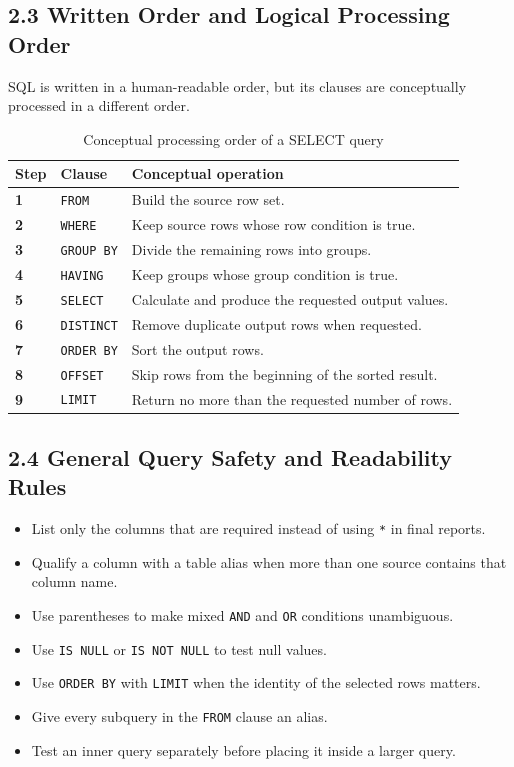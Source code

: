 \documentclass[12pt,a4paper]{article}
\begin{document}
\subsection*{2.3 Written Order and Logical Processing Order}
SQL is written in a human-readable order, but its clauses are conceptually processed in a
different order.

\begin{table}[H]
\centering
\renewcommand{\arraystretch}{1.35}
\begin{tabular}{>{\bfseries}p{1.5cm} p{3.2cm} p{7.7cm}}
\toprule
Step & Clause & Conceptual operation \\
\midrule
1 & \texttt{FROM} & Build the source row set. \\
2 & \texttt{WHERE} & Keep source rows whose row condition is true. \\
3 & \texttt{GROUP BY} & Divide the remaining rows into groups. \\
4 & \texttt{HAVING} & Keep groups whose group condition is true. \\
5 & \texttt{SELECT} & Calculate and produce the requested output values. \\
6 & \texttt{DISTINCT} & Remove duplicate output rows when requested. \\
7 & \texttt{ORDER BY} & Sort the output rows. \\
8 & \texttt{OFFSET} & Skip rows from the beginning of the sorted result. \\
9 & \texttt{LIMIT} & Return no more than the requested number of rows. \\
\bottomrule
\end{tabular}
\caption{Conceptual processing order of a SELECT query}
\label{tab:logical_order}
\end{table}

\subsection*{2.4 General Query Safety and Readability Rules}
\begin{itemize}
    \item List only the columns that are required instead of using \texttt{*} in final reports.
    \item Qualify a column with a table alias when more than one source contains that column name.
    \item Use parentheses to make mixed \texttt{AND} and \texttt{OR} conditions unambiguous.
    \item Use \texttt{IS NULL} or \texttt{IS NOT NULL} to test null values.
    \item Use \texttt{ORDER BY} with \texttt{LIMIT} when the identity of the selected rows matters.
    \item Give every subquery in the \texttt{FROM} clause an alias.
    \item Test an inner query separately before placing it inside a larger query.
\end{itemize}
\end{document}
